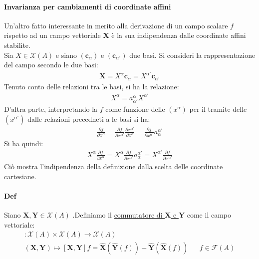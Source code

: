     \paragraph{Invarianza per cambiamenti di coordinate affini} Un'altro fatto interessante in merito alla derivazione di un campo scalare $f$ rispetto ad un campo vettoriale $\mathbf{X}$ è la sua indipendenza dalle coordinate affini stabilite.\\
    Sia $X\in \mathcal{X}(A)$ e siano $(\mathbf{c}_\alpha)$ e $(\mathbf{c}_{\alpha'})$ due basi. Si consideri la rappresentazione del campo secondo le due basi:
    \begin{align*}
        \mathbf{X}=X^\alpha\mathbf{c}_\alpha =X^{\alpha'}\mathbf{c}_{\alpha'}
    \end{align*}
    Tenuto conto delle relazioni tra le basi, si ha la relazione:
    \begin{align*}
        X^\alpha=a^\alpha_{\alpha'}X^{\alpha'}
    \end{align*}
    D'altra parte, interpretando la $f$ come funzione delle $(x^\alpha)$ per il tramite delle $(x^{\alpha'})$ dalle relazioni precedneti a le basi si ha:
    \begin{align*}
        \frac{\partial f}{\partial x^\alpha}=\frac{\partial f}{\partial x^{\alpha'}}\frac{\partial x^{\alpha'} }{\partial x^\alpha}=\frac{\partial f}{\partial x^{\alpha '}}a^{\alpha'}_\alpha
    \end{align*}
    Si ha quindi:
    \begin{align*}
        X^\alpha\frac{\partial f}{\partial x^\alpha}=X^\alpha\frac{\partial f}{\partial x^{\alpha'}}a^{\alpha'}_\alpha= X^{\alpha'}\frac{\partial f}{\partial x^{\alpha'}}
    \end{align*}
    Ciò mostra l'indipendenza della definizione dalla scelta delle coordinate cartesiane.
    \paragraph{Def} Siano $\mathbf{X},\mathbf{Y}\in \mathcal{X}(A)$ .Definiamo il \underline{commutatore di $\mathbf{X}$ e $\mathbf{Y}$} come il campo vettoriale:
    \begin{align*}
    [\cdot,\cdot]\colon \mathcal{X}(A)\times \mathcal{X}(A)\to \mathcal{X}(A)\\
        (\mathbf{X},\mathbf{Y})\mapsto[\mathbf{X},\mathbf{Y}]f=\hat{\mathbf{X}}(\hat{\mathbf{Y}}(f))-\hat{\mathbf{Y}}(\hat{\mathbf{X}}(f)) && f\in \mathcal{F}(A)
    \end{align*}

